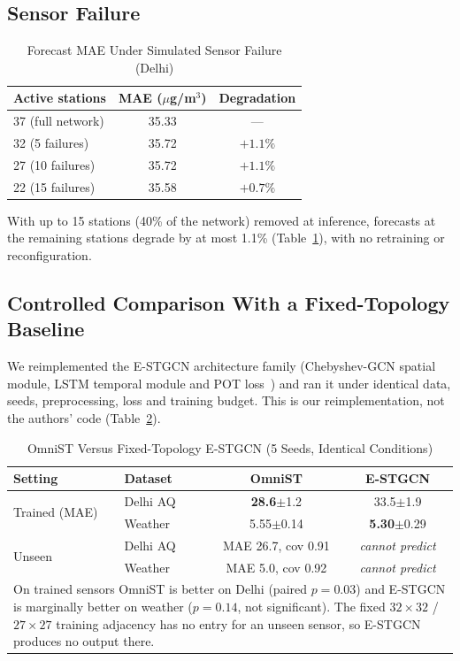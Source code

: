 \documentclass[journal,twoside,web]{ieeecolor}
\begin{document}
\subsection{Sensor Failure}

\begin{table}[htbp]
\caption{Forecast MAE Under Simulated Sensor Failure (Delhi)}
\centering
\begin{tabular}{lcc}
\toprule
\textbf{Active stations} & \textbf{MAE ($\mu$g/m$^3$)} & \textbf{Degradation} \\
\midrule
37 (full network) & 35.33 & --- \\
32 (5 failures) & 35.72 & $+1.1\%$ \\
27 (10 failures) & 35.72 & $+1.1\%$ \\
22 (15 failures) & 35.58 & $+0.7\%$ \\
\bottomrule
\end{tabular}
\label{tab:resilience}
\end{table}

With up to 15 stations (40\% of the network) removed at inference, forecasts at the remaining
stations degrade by at most 1.1\% (Table~\ref{tab:resilience}), with no retraining or
reconfiguration.

\subsection{Controlled Comparison With a Fixed-Topology Baseline}
\label{sec:controlled}

We reimplemented the E-STGCN architecture family (Chebyshev-GCN spatial module, LSTM temporal module
and POT loss~\cite{panja2026estgcn}) and ran it under identical data, seeds, preprocessing, loss and
training budget. This is our reimplementation, not the authors' code (Table~\ref{tab:controlled}).

\begin{table}[htbp]
\caption{OmniST Versus Fixed-Topology E-STGCN (5 Seeds, Identical Conditions)}
\centering
\footnotesize
\setlength{\tabcolsep}{3.5pt}
\begin{tabular}{llcc}
\toprule
\textbf{Setting} & \textbf{Dataset} & \textbf{OmniST} & \textbf{E-STGCN} \\
\midrule
\multirow{2}{*}{Trained (MAE)} & Delhi AQ & \textbf{28.6}$\pm$1.2 & 33.5$\pm$1.9 \\
                               & Weather  & 5.55$\pm$0.14 & \textbf{5.30}$\pm$0.29 \\
\midrule
\multirow{2}{*}{Unseen} & Delhi AQ & MAE 26.7, cov 0.91 & \emph{cannot predict} \\
                                & Weather  & MAE 5.0, cov 0.92 & \emph{cannot predict} \\
\bottomrule
\multicolumn{4}{p{0.95\columnwidth}}{\footnotesize On trained sensors OmniST is better on Delhi
(paired $p{=}0.03$) and E-STGCN is marginally better on weather ($p{=}0.14$, not significant). The
fixed $32{\times}32$ / $27{\times}27$ training adjacency has no entry for an unseen sensor, so
E-STGCN produces no output there.} \\
\end{tabular}
\label{tab:controlled}
\end{table}
\end{document}
